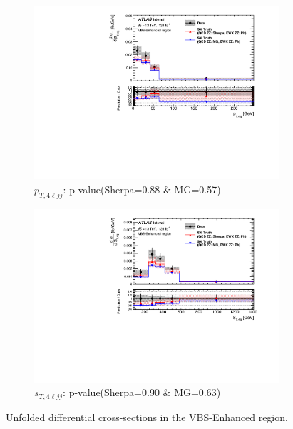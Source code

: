 \begin{figure}[!htb]
\begin{subfigure}{.48\textwidth}
        \includegraphics[width=.98\linewidth]{figures/Results/CrossSection_VBSEnhanced/xs_ptzzjj_SR.pdf}
        \caption{ \footnotesize{$p_{T,4\ell jj}$: p-value(Sherpa=0.88 $\&$ MG=0.57)}}
    \end{subfigure}
    \begin{subfigure}{.48\textwidth}
        \centering
        \includegraphics[width=.98\linewidth]{figures/Results/CrossSection_VBSEnhanced/xs_stzzjj_SR.pdf}
        \caption{ \footnotesize{$s_{T, 4\ell jj}$: p-value(Sherpa=0.90 $\&$ MG=0.63)}}
    \end{subfigure}
    \caption{Unfolded differential cross-sections in the VBS-Enhanced region.} \label{fig:unfolded_xs_VBS_Enhanced_a}
\end{figure}

